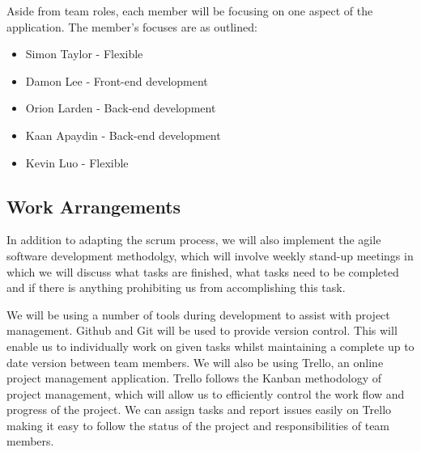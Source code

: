 \documentclass[a4paper, dvipsnames]{scrartcl}
\begin{document}
Aside from team roles, each member will be focusing on one aspect of the application. The member's focuses are as outlined:
\begin{itemize}
\item Simon Taylor - Flexible
\item Damon Lee - Front-end development
\item Orion Larden - Back-end development
\item Kaan Apaydin - Back-end development
\item Kevin Luo - Flexible
\end{itemize}

\subsection{Work Arrangements}
In addition to adapting the scrum process, we will also implement the agile software development methodolgy, which will involve weekly stand-up meetings in which we will discuss what tasks are finished, what tasks need to be completed and if there is anything prohibiting us from accomplishing this task.

We will be using a number of tools during development to assist with project management. Github and Git will be used to provide version control. This will enable us to individually work on given tasks whilst maintaining a complete up to date version between team members. We will also be using Trello, an online project management application. Trello follows the Kanban methodology of project management, which will allow us to efficiently control the work flow and progress of the project. We can assign tasks and report issues easily on Trello making it easy to follow the status of the project and responsibilities of team members.
\end{document}
